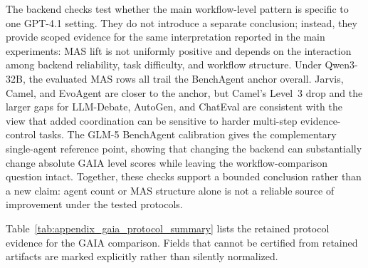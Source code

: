 \begin{table}[t]
    \centering
    \caption{\small
        \textbf{BenchAgent GAIA backend-strength calibration with GLM-5.} The table isolates the single-agent BenchAgent anchor under the GAIA protocol. Level cells report accuracy, instance-level average token usage, and instance-level average wall-clock time.
    }
    \label{tab:appendix_glm5_gaia_generalization}
    \setlength{\tabcolsep}{5pt}
    \small
    \renewcommand{\arraystretch}{1.2}
    \renewcommand{\arraystretch}{1.0}
\end{table}

The backend checks test whether the main workflow-level pattern is specific to one GPT-4.1 setting. They do not introduce a separate conclusion; instead, they provide scoped evidence for the same interpretation reported in the main experiments: MAS lift is not uniformly positive and depends on the interaction among backend reliability, task difficulty, and workflow structure. Under Qwen3-32B, the evaluated MAS rows all trail the BenchAgent anchor overall. Jarvis, Camel, and EvoAgent are closer to the anchor, but Camel's Level~3 drop and the larger gaps for LLM-Debate, AutoGen, and ChatEval are consistent with the view that added coordination can be sensitive to harder multi-step evidence-control tasks. The GLM-5 BenchAgent calibration gives the complementary single-agent reference point, showing that changing the backend can substantially change absolute GAIA level scores while leaving the workflow-comparison question intact. Together, these checks support a bounded conclusion rather than a new claim: agent count or MAS structure alone is not a reliable source of improvement under the tested protocols.

Table~\ref{tab:appendix_gaia_protocol_summary} lists the retained protocol evidence for the GAIA comparison. Fields that cannot be certified from retained artifacts are marked explicitly rather than silently normalized.

